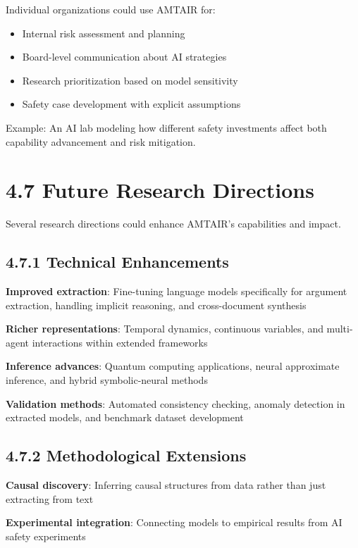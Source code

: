 \documentclass[
  11pt,
  letterpaper,
]{book}
\providecommand{\tightlist}{%
  \setlength{\itemsep}{0pt}\setlength{\parskip}{0pt}}
\begin{document}
Individual organizations could use AMTAIR for:

\begin{itemize}
\tightlist
\item
  Internal risk assessment and planning
\item
  Board-level communication about AI strategies
\item
  Research prioritization based on model sensitivity
\item
  Safety case development with explicit assumptions
\end{itemize}

Example: An AI lab modeling how different safety investments affect both
capability advancement and risk mitigation.

\section{4.7 Future Research Directions}\label{sec-future-research}

Several research directions could enhance AMTAIR's capabilities and
impact.

\subsection{4.7.1 Technical Enhancements}\label{sec-technical-future}

\textbf{Improved extraction}: Fine-tuning language models specifically
for argument extraction, handling implicit reasoning, and cross-document
synthesis

\textbf{Richer representations}: Temporal dynamics, continuous
variables, and multi-agent interactions within extended frameworks

\textbf{Inference advances}: Quantum computing applications, neural
approximate inference, and hybrid symbolic-neural methods

\textbf{Validation methods}: Automated consistency checking, anomaly
detection in extracted models, and benchmark dataset development

\subsection{4.7.2 Methodological
Extensions}\label{sec-methodological-future}

\textbf{Causal discovery}: Inferring causal structures from data rather
than just extracting from text

\textbf{Experimental integration}: Connecting models to empirical
results from AI safety experiments
\end{document}
